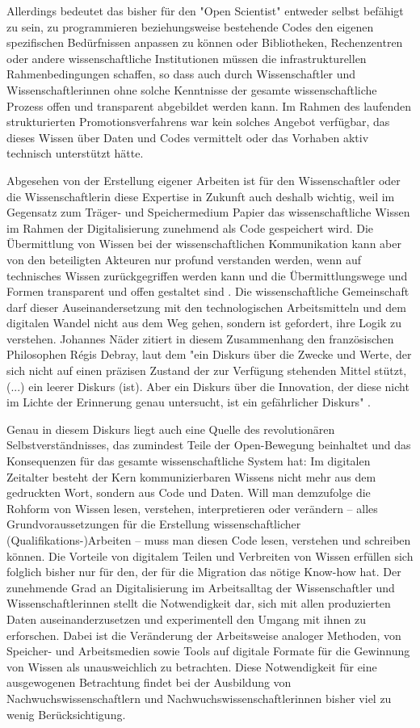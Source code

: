 Allerdings bedeutet das bisher für den "Open Scientist" entweder selbst befähigt zu sein, zu programmieren beziehungsweise bestehende Codes den eigenen spezifischen Bedürfnissen anpassen zu können oder Bibliotheken, Rechenzentren oder andere wissenschaftliche Institutionen müssen die infrastrukturellen Rahmenbedingungen schaffen, so dass auch durch Wissenschaftler und Wissenschaftlerinnen ohne solche Kenntnisse der gesamte wissenschaftliche Prozess offen und transparent abgebildet werden kann. Im Rahmen des laufenden strukturierten Promotionsverfahrens war kein solches Angebot verfügbar, das dieses Wissen über Daten und Codes vermittelt oder das Vorhaben aktiv technisch unterstützt hätte.

Abgesehen von der Erstellung eigener Arbeiten ist für den Wissenschaftler oder die Wissenschaftlerin diese Expertise in Zukunft auch deshalb wichtig, weil im Gegensatz zum Träger- und Speichermedium Papier das wissenschaftliche Wissen im Rahmen der Digitalisierung zunehmend als Code gespeichert wird. Die Übermittlung von Wissen bei der wissenschaftlichen Kommunikation kann aber von den beteiligten Akteuren nur profund verstanden werden, wenn auf technisches Wissen zurückgegriffen werden kann und die Übermittlungswege und Formen transparent und offen gestaltet sind \cite{Davis_2011}. Die wissenschaftliche Gemeinschaft darf dieser Auseinandersetzung mit den technologischen Arbeitsmitteln und dem digitalen Wandel nicht aus dem Weg gehen, sondern ist gefordert, ihre Logik zu verstehen. Johannes Näder zitiert in diesem Zusammenhang den französischen Philosophen Régis Debray, laut dem "ein Diskurs über die Zwecke und Werte, der sich nicht auf einen präzisen Zustand der zur Verfügung stehenden Mittel stützt, (...) ein leerer Diskurs (ist). Aber ein Diskurs über die Innovation, der diese nicht im Lichte der Erinnerung genau untersucht, ist ein gefährlicher Diskurs" \cite[:117]{Naeder_2010} \cite[:246]{Debray_2003}.

Genau in diesem Diskurs liegt auch eine Quelle des revolutionären Selbstverständnisses, das zumindest Teile der Open-Bewegung beinhaltet und das Konsequenzen für das gesamte wissenschaftliche System hat: Im digitalen Zeitalter besteht der Kern kommunizierbaren Wissens nicht mehr aus dem gedruckten Wort, sondern aus Code und Daten. Will man demzufolge die Rohform von Wissen lesen, verstehen, interpretieren oder verändern – alles Grundvoraussetzungen für die Erstellung wissenschaftlicher (Qualifikations-)Arbeiten – muss man diesen Code lesen, verstehen und schreiben können. Die Vorteile von digitalem Teilen und Verbreiten von Wissen erfüllen sich folglich bisher nur für den, der für die Migration das nötige Know-how hat. Der zunehmende Grad an Digitalisierung im Arbeitsalltag der Wissenschaftler und Wissenschaftlerinnen stellt die Notwendigkeit dar, sich mit allen produzierten Daten auseinanderzusetzen und experimentell den Umgang mit ihnen zu erforschen. Dabei ist die Veränderung der Arbeitsweise analoger Methoden, von Speicher- und Arbeitsmedien sowie Tools auf digitale Formate für die Gewinnung von Wissen als unausweichlich zu betrachten. Diese Notwendigkeit für eine ausgewogenen Betrachtung findet bei der Ausbildung von Nachwuchswissenschaftlern und Nachwuchswissenschaftlerinnen bisher viel zu wenig Berücksichtigung.

